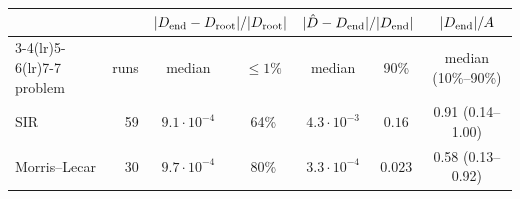\begin{tabular}{lrccccc}
\toprule
& & \multicolumn{2}{c}{$|D_{\rm end}-D_{\rm root}|/|D_{\rm root}|$} & \multicolumn{2}{c}{$|\hat D-D_{\rm end}|/|D_{\rm end}|$} & $|D_{\rm end}|/A$\\
\cmidrule(lr){3-4}\cmidrule(lr){5-6}\cmidrule(lr){7-7}
problem & runs & median & $\le1\%$ & median & 90\% & median (10\%--90\%)\\
\midrule
SIR & 59 & $9.1\cdot10^{-4}$ & 64\% & $4.3\cdot10^{-3}$ & $0.16$ & 0.91 (0.14--1.00)\\
Morris--Lecar & 30 & $9.7\cdot10^{-4}$ & 80\% & $3.3\cdot10^{-4}$ & $0.023$ & 0.58 (0.13--0.92)\\
\bottomrule
\end{tabular}
